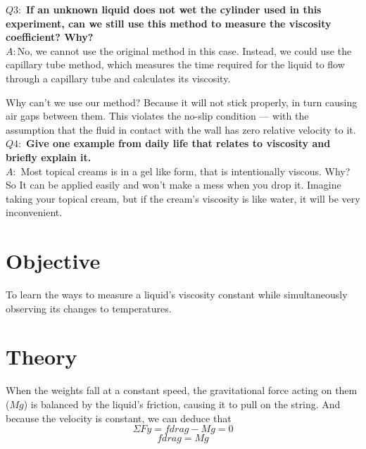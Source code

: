 \documentclass[12pt]{article}
\begin{document}
\noindent
$Q3:$
\textbf{If an unknown liquid does not wet the cylinder used in this experiment, can we still use this method to measure the viscosity coefficient? Why?}\\
$A:$No, we cannot use the original method in this case. Instead, we could use the capillary tube method, which measures the time required for the liquid to flow through a capillary tube and calculates its viscosity. 

Why can't we use our method? Because it will not stick properly, in turn causing air gaps between them. This violates the no-slip condition — with the assumption that the fluid in contact with the wall has zero relative velocity to it.\\

\noindent
$Q4:$
\textbf{Give one example from daily life that relates to viscosity and briefly explain it.} \\
$A:$
Most topical creams is in a gel like form, that is intentionally viscous.  Why? So It can be applied easily and won't make a mess when you drop it. Imagine taking your topical cream, but if the cream's viscosity is like water, it will be very inconvenient.
\large
\section{\textbf{Objective}}
To learn the ways to measure a liquid's viscosity constant while simultaneously observing its changes to temperatures.





\section{\textbf{Theory}}
When the weights fall at a constant speed, the gravitational force acting on them ($Mg$) is balanced by the liquid's friction, causing it to pull on the string. And because the velocity is constant, we can deduce that
\[
\Sigma Fy = fdrag-Mg=0
\]
\[
fdrag=Mg
\]
\end{document}
